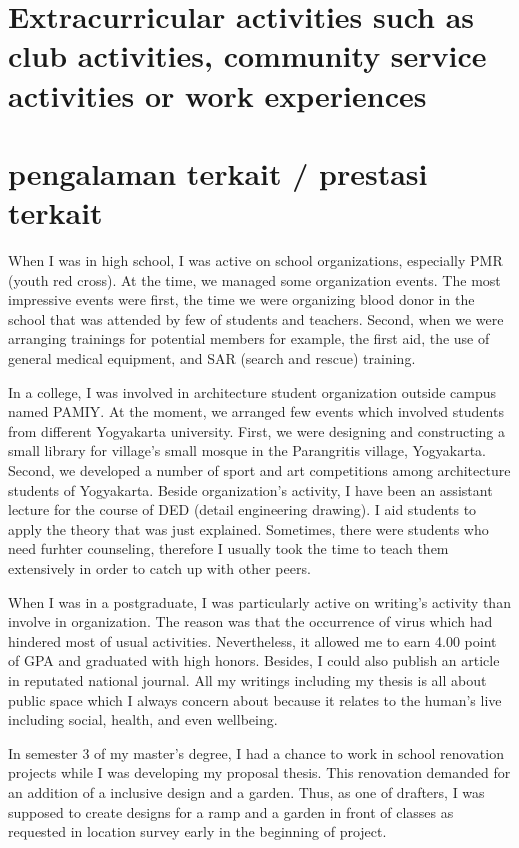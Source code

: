 \documentclass[11pt]{simart} %
\begin{document}
\section{Extracurricular activities such as club activities, community service activities or work experiences}
\section*{pengalaman terkait / prestasi terkait}
When I was in high school, I was active on school organizations, especially PMR (youth red cross). At the time, we managed some organization events. The most impressive events were first, the time we were organizing blood donor in the school that was attended by few of students and teachers. Second, when we were arranging trainings for potential members for example, the first aid, the use of general medical equipment, and SAR (search and rescue) training.

In a college, I was involved in architecture student organization outside campus named PAMIY. At the moment, we arranged few events which involved students from different Yogyakarta university. First, we were designing and constructing a small library for village's small mosque in the Parangritis village, Yogyakarta. Second, we developed a number of sport and art competitions among architecture students of Yogyakarta. Beside organization's activity, I have been an assistant lecture for the course of DED (detail engineering drawing). I aid students to apply the theory that was just explained. Sometimes, there were  students who need furhter counseling, therefore I usually took the time to teach them extensively in order to catch up with other peers.

When I was in a postgraduate, I was particularly active on writing's activity than involve in organization. The reason was that the occurrence of virus which had hindered most of usual activities. Nevertheless, it allowed me to earn 4.00 point of GPA and graduated with high honors. Besides, I could also publish an article in reputated national journal. All my writings including my thesis is all about public space which I always concern about because it relates to the human's live including social, health, and even wellbeing.

In semester 3 of my master's degree, I had a chance to work in school renovation projects while I was developing my proposal thesis. This renovation demanded for an addition of a inclusive design and a garden. Thus, as one of drafters, I was supposed to create designs for a ramp and a garden in front of classes as requested in location survey early in the beginning of project. %
\end{document}
